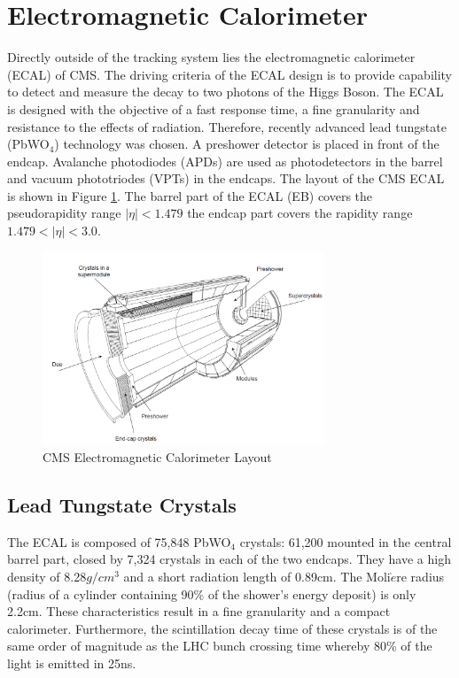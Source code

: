  \section{Electromagnetic Calorimeter}
Directly outside of the tracking system lies the electromagnetic calorimeter 
(ECAL) of CMS. The driving criteria of the ECAL design is to provide capability
to detect and measure the decay to two photons of the Higgs Boson. The 
ECAL is designed with the objective of a
fast response time, a fine granularity and resistance to the effects of radiation.
Therefore, recently advanced lead tungstate (PbWO$_{4}$) technology was chosen. 
A preshower detector is placed in front of the endcap. Avalanche photodiodes (APDs)
are used as photodetectors in the barrel and vacuum phototriodes (VPTs) in the
endcaps.
The layout of the CMS ECAL is shown in Figure \ref{fig:ECALLayout}.
The barrel part of the ECAL (EB) covers the pseudorapidity range $|\eta|<1.479$
the endcap part covers the rapidity range $1.479<|\eta|<3.0$.
\begin{figure}[hb]
  \centering
	\includegraphics[width=0.75\textwidth]{images/ECALlayout.png}
  	\caption[ECAL Layout]
   	{CMS Electromagnetic Calorimeter Layout}
	\label{fig:ECALLayout}
\end{figure}
\subsection{Lead Tungstate Crystals}
The ECAL is composed of 75,848 PbWO$_{4}$ crystals: 61,200 mounted in the 
central barrel part, closed by 7,324 crystals in each of the two endcaps. They 
have a high density of 8.28$g/cm^{3}$ and a short radiation length of 0.89cm. 
The Moli$\grave{e}$re radius (radius of a cylinder containing 90\% of the shower's energy deposit) 
is only 2.2cm. These characteristics result in a fine granularity and a compact
calorimeter. Furthermore, the scintillation decay time of these crystals is of the
same order of magnitude as the LHC bunch crossing time whereby 80\% of 
the light is emitted in 25ns. 
